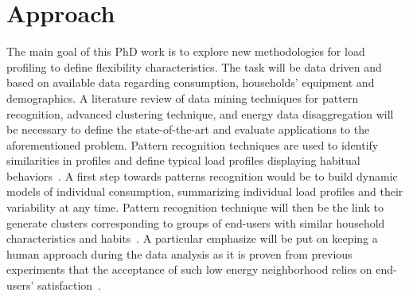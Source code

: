 \documentclass[fleqn,a4paper,twoside,10pt]{article}
\begin{document}

\section{Approach}
	
 	The main goal of this PhD work is to explore new methodologies for load profiling to define flexibility characteristics. The task will be data driven and based on available data regarding consumption, households' equipment and demographics. A literature review of data mining techniques for pattern recognition, advanced clustering technique, and energy data disaggregation will be necessary to define the state-of-the-art and evaluate applications to the aforementioned problem. Pattern recognition techniques are used to identify similarities in profiles and define typical load profiles displaying habitual behaviors~\cite{Abreu2012}. A first step towards patterns recognition would be to build dynamic models of individual consumption, summarizing individual load profiles and their variability at any time. Pattern recognition technique will then be the link to generate clusters corresponding to groups of end-users with similar household characteristics and habits~\cite{albert2013}. A particular emphasize will be put on keeping a human approach during the data analysis as it is proven from previous experiments that the acceptance of such low energy neighborhood relies on end-users' satisfaction~\cite{Mlecnik2012}.
 	
\end{document}
